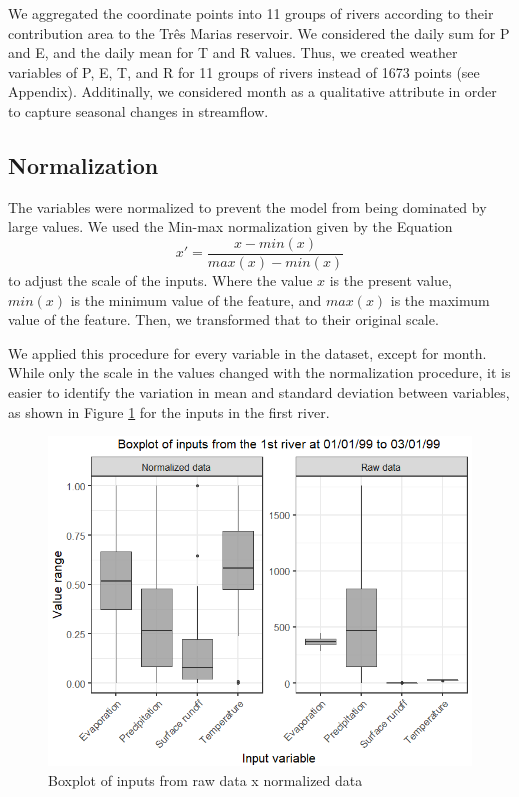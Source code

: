 \documentclass[12pt]{article}
\begin{document}
We aggregated the coordinate points into 11 groups of rivers according to their contribution area to the Três Marias reservoir. We considered the daily sum for P and E, and the daily mean for T and R values. Thus, we created weather variables of P, E, T, and R for 11 groups of rivers instead of 1673 points (see Appendix). Additinally, we considered month as a qualitative attribute in order to capture seasonal changes in streamflow.

\subsection{Normalization}

The variables were normalized to prevent the model from being dominated by large values. We used the Min-max normalization given by the Equation
\begin{equation}
    \label{eqn:Normalization}
    x' = \frac{x-min(x)}{max(x)-min(x)}
\end{equation}
to adjust the scale of the inputs. Where the value $x$ is the present value, $min(x)$ is the minimum value of the feature, and $max(x)$ is the maximum value of the feature. Then, we transformed that to their original scale.

We applied this procedure for every variable in the dataset, except for month. While only the scale in the values changed with the normalization procedure, it is easier to identify the variation in mean and standard deviation between variables, as shown in Figure \ref{fig:Normalized} for the inputs in the first river.

\begin{figure}[htbp]
    \centering
    \includegraphics[width=0.8\linewidth, trim=0cm 0 0 .7cm,clip=true]{Figures/Normalização.png}
    \caption{Boxplot of inputs from raw data x normalized data}
    \label{fig:Normalized}
\end{figure}
\end{document}
